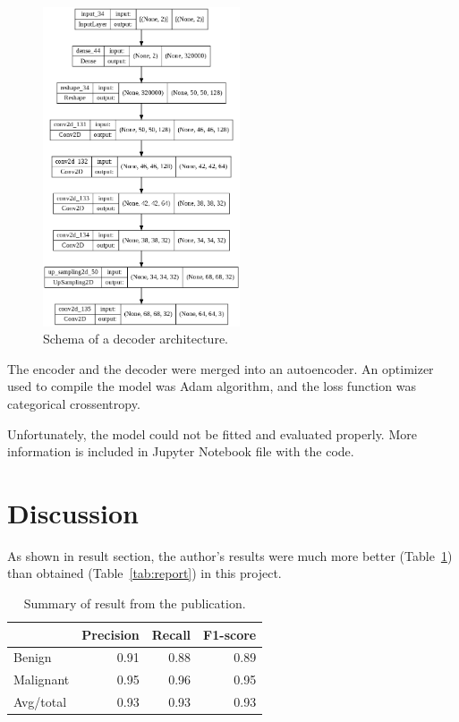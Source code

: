 \documentclass[12pt]{article}
\begin{document}
\begin{figure}[!ht]
\centering
\includegraphics[width=0.52\textwidth]{decoder_sum.png}
\caption{\label{fig:decoder_sum}Schema of a decoder architecture.}
\end{figure}

The encoder and the decoder were merged into an autoencoder. An optimizer used to compile the model was Adam algorithm, and the loss function was categorical crossentropy. 

Unfortunately, the model could not be fitted and evaluated properly. More information is included in Jupyter Notebook file with the code.



\section{Discussion}
As shown in result section, the author's results were much more better (Table~\ref{tab:report_pub}) than obtained (Table~\ref{tab:report}) in this project.

\begin{table}[!ht]
\centering
\begin{tabular}{l|r r r}
 & Precision & Recall & F1-score \\
\hline
Benign & 0.91 & 0.88 & 0.89 \\
Malignant & 0.95 & 0.96 & 0.95 \\
Avg/total & 0.93 & 0.93 & 0.93 \\
\end{tabular}
\caption{\label{tab:report_pub}Summary of result from the publication\cite{1}.}
\end{table}
\end{document}
